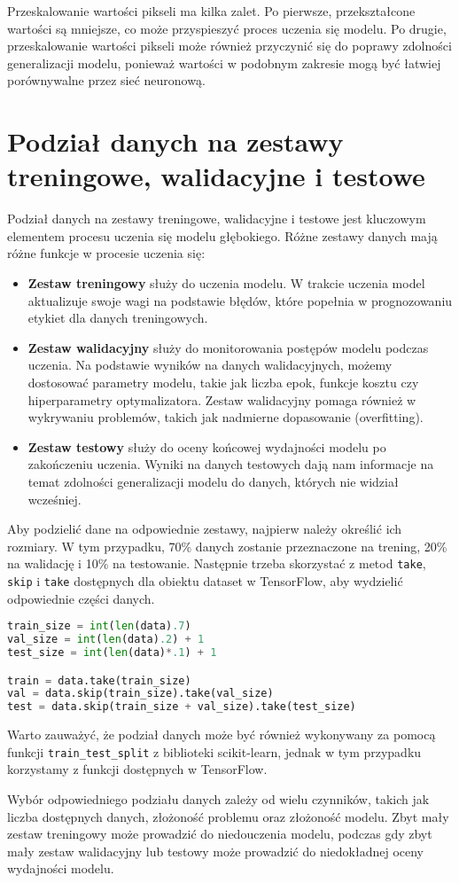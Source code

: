 Przeskalowanie wartości pikseli ma kilka zalet. Po pierwsze, przekształcone wartości są mniejsze, co może przyspieszyć proces uczenia się modelu. Po drugie, przeskalowanie wartości pikseli może również przyczynić się do poprawy zdolności generalizacji modelu, ponieważ wartości w podobnym zakresie mogą być łatwiej porównywalne przez sieć neuronową.

\section{Podział danych na zestawy treningowe, walidacyjne i testowe}
Podział danych na zestawy treningowe, walidacyjne i testowe jest kluczowym elementem procesu uczenia się modelu głębokiego. Różne zestawy danych mają różne funkcje w procesie uczenia się:

\begin{itemize}
\item \textbf{Zestaw treningowy} służy do uczenia modelu. W trakcie uczenia model aktualizuje swoje wagi na podstawie błędów, które popełnia w prognozowaniu etykiet dla danych treningowych.
\item \textbf{Zestaw walidacyjny} służy do monitorowania postępów modelu podczas uczenia. Na podstawie wyników na danych walidacyjnych, możemy dostosować parametry modelu, takie jak liczba epok, funkcje kosztu czy hiperparametry optymalizatora. Zestaw walidacyjny pomaga również w wykrywaniu problemów, takich jak nadmierne dopasowanie (overfitting).
\item \textbf{Zestaw testowy} służy do oceny końcowej wydajności modelu po zakończeniu uczenia. Wyniki na danych testowych dają nam informacje na temat zdolności generalizacji modelu do danych, których nie widział wcześniej.
\end{itemize}

Aby podzielić dane na odpowiednie zestawy, najpierw należy określić ich rozmiary. W tym przypadku, 70\% danych zostanie przeznaczone na trening, 20\% na walidację i 10\% na testowanie. Następnie trzeba skorzystać z metod \texttt{take}, \texttt{skip} i \texttt{take} dostępnych dla obiektu dataset w TensorFlow, aby wydzielić odpowiednie części danych.

\begin{lstlisting}[language=Python]
train_size = int(len(data).7)
val_size = int(len(data).2) + 1
test_size = int(len(data)*.1) + 1

train = data.take(train_size)
val = data.skip(train_size).take(val_size)
test = data.skip(train_size + val_size).take(test_size)
\end{lstlisting}

Warto zauważyć, że podział danych może być również wykonywany za pomocą funkcji \texttt{train\_test\_split} z biblioteki scikit-learn, jednak w tym przypadku korzystamy z funkcji dostępnych w TensorFlow.

Wybór odpowiedniego podziału danych zależy od wielu czynników, takich jak liczba dostępnych danych, złożoność problemu oraz złożoność modelu. Zbyt mały zestaw treningowy może prowadzić do niedouczenia modelu, podczas gdy zbyt mały zestaw walidacyjny lub testowy może prowadzić do niedokładnej oceny wydajności modelu.